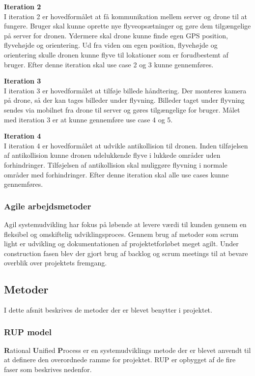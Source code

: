 \textbf{Iteration 2}\\
I iteration 2 er hovedformålet at få kommunikation mellem server og drone til at fungere. Bruger skal kunne oprette nye flyveopsætninger og gøre dem tilgængelige på server for dronen. Ydermere skal drone kunne finde egen GPS position, flyvehøjde og orientering. Ud fra viden om egen position, flyvehøjde og orientering skulle dronen kunne flyve til lokationer som er forudbestemt af bruger. Efter denne iteration skal use case 2 og 3 kunne gennemføres.

\textbf{Iteration 3}\\
I iteration 3 er hovedformålet at tilføje billede håndtering. Der monteres kamera på drone, så der kan tages billeder under flyvning. Billeder taget under flyvning sendes via mobilnet fra drone til server og gøres tilgængelige for bruger. Målet med iteration 3 er at kunne gennemføre use case 4 og 5.

\textbf{Iteration 4}\\
I iteration 4 er hovedformålet at udvikle antikollision til dronen. Inden tilføjelsen af antikollision kunne dronen udelukkende flyve i lukkede områder uden forhindringer. Tilføjelsen af antikollision skal muliggøre flyvning i normale områder med forhindringer. Efter denne iteration skal alle use cases kunne gennemføres.


\subsubsection*{Agile arbejdsmetoder}
Agil systemudvikling har fokus på løbende at levere værdi til kunden gennem en fleksibel og omskiftelig udviklingsproces. Gennem brug af metoder som scrum light er udvikling og dokumentationen af projektetforløbet meget agilt. Under construction fasen blev der gjort brug af backlog og scrum meetings til at bevare overblik over projektets fremgang.


\newpage
\subsection{Metoder}
I dette afsnit beskrives de metoder der er blevet benytter i projektet.

\subsubsection*{RUP model}
\textbf{R}ational \textbf{U}nified \textbf{P}rocess er en systemudviklings metode der er blevet anvendt til at definere den overordnede ramme for projektet. RUP er opbygget af de fire faser som beskrives nedenfor.  

